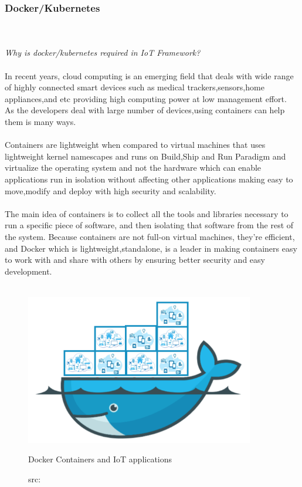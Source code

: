 \subsubsection{Docker/Kubernetes}
\hfill\\
\hfill\\
\emph{Why is docker/kubernetes required in IoT Framework?}\\ \\ 
In recent years, cloud computing is an emerging field that deals with wide range of highly connected smart devices such as medical trackers,sensors,home appliances,and etc providing high computing power at low management effort.\\
As the developers deal with large number of devices,using containers can help them is many ways.\\ \\
Containers are lightweight when compared to virtual machines that uses lightweight kernel namescapes and runs on Build,Ship and Run Paradigm and virtualize the operating system and not the hardware which can enable applications run in isolation without affecting other applications making easy to move,modify and deploy with high security and scalability.\\ \\
The main idea of containers is to collect all the tools and libraries necessary to run a specific piece of software, and then isolating that software from the rest of the system. Because containers are not full-on virtual machines, they’re efficient, and Docker which is lightweight,standalone, is a leader in making containers easy to work with and share with others by ensuring better security and easy development\cite{8}.\\ \\

\begin{figure}[H]
	\centering
	\includegraphics[width=10cm]{image/iot_containers.png}
	\caption{Docker Containers and IoT applications}
	\caption*{src:\cite{docker}}
\end{figure}

